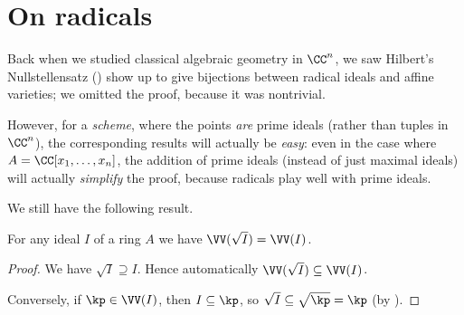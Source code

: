 \section{On radicals}
Back when we studied classical algebraic geometry in $\CC^n$,
we saw Hilbert's Nullstellensatz () show up
to give bijections between radical ideals and affine varieties;
we omitted the proof, because it was nontrivial.

However, for a \emph{scheme}, where the points \emph{are} prime ideals
(rather than tuples in $\CC^n$),
the corresponding results will actually be \emph{easy}:
even in the case where $A = \CC[x_1, \dots, x_n]$,
the addition of prime ideals (instead of just maximal ideals)
will actually \emph{simplify} the proof,
because radicals play well with prime ideals.

We still have the following result.
\begin{proposition}
	[$\VV(\sqrt I) = \VV(I)$]
	For any ideal $I$ of a ring $A$
	we have $\VV(\sqrt I) = \VV(I)$.
\end{proposition}
\begin{proof}
	We have $\sqrt I \supseteq I$.
	Hence automatically $\VV(\sqrt I) \subseteq \VV(I)$.

	Conversely, if $\kp \in \VV(I)$, then $I \subseteq \kp$,
	so $\sqrt I \subseteq \sqrt{\kp} = \kp$
	(by ).
\end{proof}

